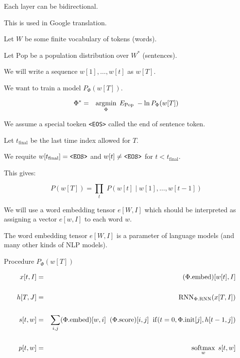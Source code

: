 {\vfill
Each layer can be bidirectional.

\vfill
This is used in Google translation.


Let $W$ be some finite vocabulary of tokens (words).

\vfill
Let $\mathrm{Pop}$ be a population distribution over $W^*$ (sentences).

\vfill
We will write a sequence $w[1],\ldots,w[t]$ as $w[T]$.

\vfill
We want to train a model $P_\Phi(w[T])$.

\begin{eqnarray*}
\Phi^* & = & \operatorname*{argmin}_\Phi \; E_{\mathrm{Pop}}\;-\ln P_\Phi(w[T])
\end{eqnarray*}


\vfill
We assume a special toeken {\tt <EOS>} called the end of sentence token.

\vfill
Let $t_{\mathrm{final}}$ be the last time index allowed for $T$.

\vfill
We requite $w[t_{\mathrm{final}}] = \mbox{\tt <EOS>}$ and $w[t] \not = \mbox{\tt <EOS>}$ for $t < t_{\mathrm{final}}$.

\vfill
This gives:

$$P(w[T]) = \prod_t\;P(w[t]\;|\;w[1],\ldots,w[t-1])$$



We will use a word embedding tensor $e[W,I]$ which should be interpreted as assigning a vector $e[w,I]$ to each word $w$.

\vfill
The word embedding tensor $e[W,I]$ is a parameter of language models (and many other kinds of NLP models).


Procedure $P_\Phi(w[T])$

\vfill
{\huge \begin{eqnarray*}
x[t,I] & = & (\Phi.\mathrm{embed})[w[t],I] \\
\\
h[T,J] & = & \mathrm{RNN}_{\Phi.\mathrm{RNN}}(x[T,I]) \\
\\
s[t,w] & = & \sum_{i,j} (\Phi.\mathrm{embed})[w,i]\;\;(\Phi.\mathrm{score})[i,j]\;\;\mathrm{if}(t=0,\Phi.\mathrm{init}[j],h[t-1,j]) \\
\\
p[t,w] & = & \operatorname*{softmax}_w\;s[t,w]
\end{eqnarray*}
}

}
